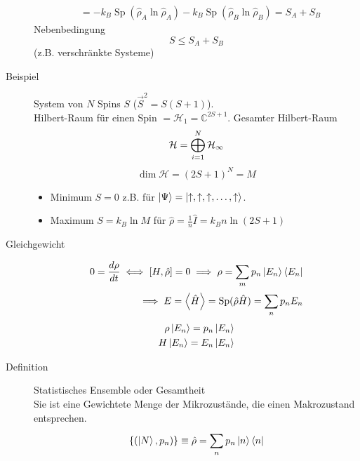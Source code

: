 \documentclass[11pt]{article}
\theoremstyle{plain}
\newcommand{\C}{\mathbb{C}}
\begin{document}
\begin{description}
\begin{align*}
    & = -k_B \operatorname{Sp} (\hat{\rho}_A \ln{ \hat{\rho}_A}) - k_B \operatorname{Sp}
    (\hat{\rho}_B \ln{ \hat{\rho}_B}) = S_A + S_B
  \end{align*}
  Nebenbedingung
  \[ S \le S_A + S_B \] (z.B. verschr\"ankte Systeme)
\item[Beispiel] System von $N$ Spins $S$ ($\vec{S}^2 =  S(S+1)$). \\
  Hilbert-Raum f\"ur einen Spin $= \mathcal{H}_1 = \C^{2S+1}$.
  Gesamter Hilbert-Raum \[ \mathcal{H} = \bigoplus_{i=1}^{N}\cal{H}_1\] 
  \[ \operatorname{dim} \mathcal{H} = (2S+1)^N = M \] 
  \begin{itemize}
    \item Minimum $S=0$ z.B. f\"ur $\Ket{\Psi} = \Ket{ \uparrow, \uparrow, \uparrow, \ldots, \uparrow}$.
    \item Maximum $S= k_B \ln{M}$ f\"ur $\hat{\rho}= \frac{1}{n} \hat{I}=
      k_B n \ln{(2S+1)}$
  \end{itemize}
\item[Gleichgewicht]
  \begin{align*}
    0= \frac{d \rho }{dt} \iff \left[ H, \hat{\rho} \right]=0 \implies 
    \rho = \sum_{m}^{} p_n \Ket{E_n} \Bra{E_n} \\
    \implies E = \Braket{\hat{H}} = \operatorname{Sp} (\hat{\rho} \hat{H})
    = \sum_{n}^{} p_n E_n
  \end{align*}
  \begin{align*}
    \rho \Ket{E_n} = p_n \Ket{E_n} \\
    H \Ket{E_n} = E_n \Ket{E_n}
  \end{align*}
\end{description}
\begin{description}
  \item[Definition]  Statistisches Ensemble oder Gesamtheit \\
    Sie ist eine Gewichtete Menge der Mikrozust\"ande, die einen 
    Makrozustand entsprechen.
    \begin{align*}
      \left\{ ( \Ket{N}, p_n) \right\} \equiv \hat{\rho} = \sum_{n}^{} p_n
      \Ket{n} \Bra{n} 
    \end{align*}
\end{description}
\end{document}
